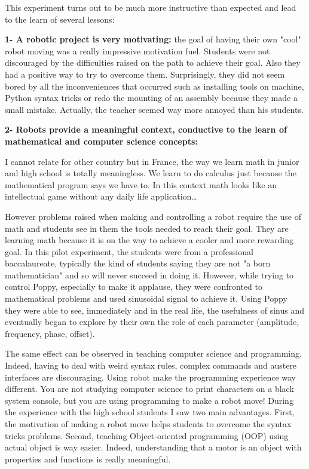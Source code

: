 This experiment turns out to be much more instructive than expected and lead to the learn of several lessons:

\textbf{1- A robotic project is very motivating:} the goal of having their own "cool" robot moving was a really impressive motivation fuel. Students were not discouraged by the difficulties raised on the path to achieve their goal. Also they had a positive way to try to overcome them. Surprisingly, they did not seem bored by all the inconveniences that occurred such as installing tools on machine, Python syntax tricks or redo the mounting of an assembly because they made a small mistake. Actually, the teacher seemed way more annoyed than his students.

\textbf{2- Robots provide a meaningful context, conductive to the learn of mathematical and computer science concepts:}

I cannot relate for other country but in France, the way we learn math in junior and high school is totally meaningless. We learn to do calculus just because the mathematical program says we have to. In this context math looks like an intellectual game without any daily life application\dots

However problems raised when making and controlling a robot require the use of math and students see in them the tools needed to reach their goal. They are learning math because it is on the way to achieve a cooler and more rewarding goal. In this pilot experiment, the students were from a professional baccalaureate, typically the kind of students saying they are not "a born mathematician" and so will never succeed in doing it. However, while trying to control Poppy, especially to make it applause, they were confronted to mathematical problems and used sinusoidal signal to achieve it. Using Poppy they were able to see, immediately and in the real life, the usefulness of sinus and eventually began to explore by their own the role of each parameter (amplitude, frequency, phase, offset).

The same effect can be observed in teaching computer science and programming. Indeed, having to deal with weird syntax rules, complex commands and austere interfaces are discouraging. Using robot make the programming experience way different. You are not studying computer science to print characters on a black system console, but you are using programming to make a robot move!
During the experience with the high school students I saw two main advantages. First, the motivation of making a robot move helps students to overcome the syntax tricks problems. Second, teaching Object-oriented programming (OOP) using actual object is way easier. Indeed, understanding that a motor is an object with properties and functions is really meaningful.


